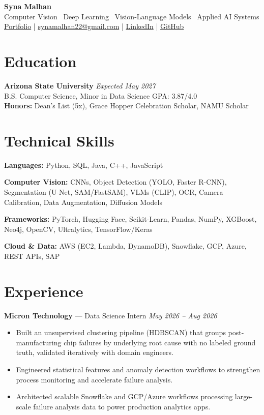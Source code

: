 \documentclass[a4paper,8pt]{extarticle}
\begin{document}
\begin{center}
{\Large \textbf{Syna Malhan}}\\
Computer Vision \textbullet\  Deep Learning \textbullet\  Vision-Language Models \textbullet\  Applied AI Systems\\
\href{https://synamalhan.github.io/website/}{Portfolio}
\;|\;
\href{mailto:synamalhan22@gmail.com}{synamalhan22@gmail.com}
\;|\;
\href{https://www.linkedin.com/in/synamalhan/}{LinkedIn}
\;|\;
\href{https://github.com/synamalhan}{GitHub}
\end{center}

\section*{Education}

\noindent
\textbf{Arizona State University} \hfill \textit{Expected May 2027}\\
\noindent
B.S. Computer Science, Minor in Data Science \hfill GPA: 3.87/4.0\\
\noindent
\textbf{Honors:} Dean's List (5x), Grace Hopper Celebration Scholar, NAMU Scholar

\section*{Technical Skills}

\noindent
\textbf{Languages:} Python, SQL, Java, C++, JavaScript

\noindent
\textbf{Computer Vision:} CNNs, Object Detection (YOLO, Faster R-CNN), Segmentation (U-Net, SAM/FastSAM), VLMs (CLIP), OCR, Camera Calibration, Data Augmentation, Diffusion Models

\noindent
\textbf{Frameworks:} PyTorch, Hugging Face, Scikit-Learn, Pandas, NumPy, XGBoost, Neo4j, OpenCV, Ultralytics, TensorFlow/Keras

\noindent
\textbf{Cloud \& Data:} AWS (EC2, Lambda, DynamoDB), Snowflake, GCP, Azure, REST APIs, SAP

\section*{Experience}

\noindent
\textbf{Micron Technology} --- Data Science Intern
\hfill \textit{May 2026 -- Aug 2026}

\begin{itemize}
\item Built an unsupervised clustering pipeline (HDBSCAN) that groups post-manufacturing chip failures by underlying root cause with no labeled ground truth, validated iteratively with domain engineers.
\item Engineered statistical features and anomaly detection workflows to strengthen process monitoring and accelerate failure analysis.
\item Architected scalable Snowflake and GCP/Azure workflows processing large-scale failure analysis data to power production analytics apps.
\end{itemize}
\end{document}
